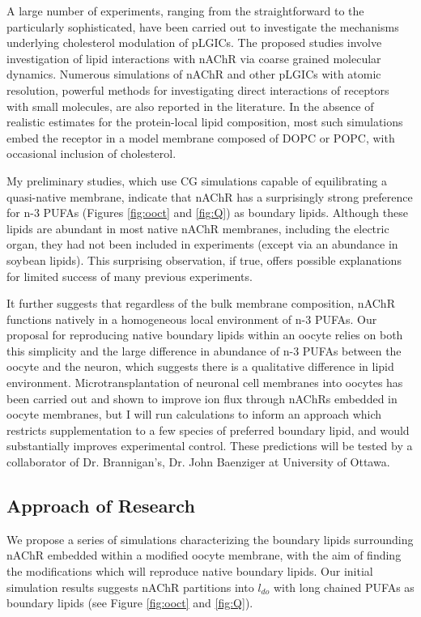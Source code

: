 \documentclass{article}
\begin{document}
A large number of experiments, ranging from the straightforward to the particularly sophisticated, have been carried out to investigate the mechanisms underlying cholesterol modulation of pLGICs. The proposed studies involve investigation of lipid interactions with nAChR via coarse grained molecular dynamics. Numerous simulations of nAChR and other pLGICs with atomic resolution, powerful methods for investigating direct interactions of receptors with small molecules, are also reported in the literature. In the absence of realistic estimates for the protein-local lipid composition, most such simulations embed the receptor in a model membrane composed of DOPC or POPC, with occasional inclusion of cholesterol.

My preliminary studies, which use CG simulations capable of equilibrating a quasi-native membrane, indicate that nAChR has a surprisingly strong preference for n-3 PUFAs (Figures \ref{fig:ooct} and \ref{fig:Q}) as boundary lipids. Although these lipids are abundant in most native nAChR membranes, including the electric organ, they had not been included in experiments (except via an abundance in soybean lipids). This surprising observation, if true, offers possible explanations for limited success of many previous experiments.

It further suggests that regardless of the bulk membrane composition, nAChR functions natively in a homogeneous local environment of n-3 PUFAs. Our proposal for reproducing native boundary lipids within an oocyte relies on both this simplicity and the large difference in abundance of n-3 PUFAs between the oocyte and the neuron, which suggests there is a qualitative difference in lipid environment. Microtransplantation of neuronal cell membranes into oocytes \cite{Conti2013} has been carried out and shown to improve ion flux through nAChRs embedded in oocyte membranes, but I will run calculations to inform an approach which restricts supplementation to a few species of preferred boundary lipid, and would substantially improves experimental control. These predictions will be tested by a collaborator of Dr. Brannigan’s, Dr. John Baenziger at University of Ottawa.

\subsection{Approach of Research}

We propose a series of simulations characterizing the boundary lipids surrounding nAChR embedded within a modified oocyte membrane, with the aim of finding the modifications which will reproduce native boundary lipids. Our initial simulation results suggests nAChR partitions into $l_{do}$ with long chained PUFAs as boundary lipids (see Figure \ref{fig:ooct} and \ref{fig:Q}).
\end{document}
